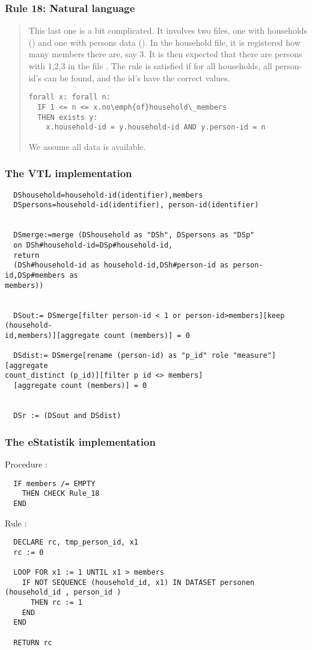 \newpage

\subsubsection*{  Rule 18: Natural language}
\begin{quote}


This last one is a bit complicated. It involves two files, one with households () and one with persons data (). In the household file, it is registered how many members there are, say 3. It is then expected that
there are persons with  1,2,3 in the file . The rule is satisfied if for all households, all person-id's can be found, and the id's have the correct values.


\begin{verbatim}
forall x: forall n:
  IF 1 <= n <= x.no\emph{of}household\_members
  THEN exists y: 
    x.household-id = y.household-id AND y.person-id = n
\end{verbatim}


We assume all data is available.

\end{quote}
\subsubsection*{The VTL implementation}
\begin{verbatim}
  DShousehold=household-id(identifier),members
  DSpersons=household-id(identifier), person-id(identifier)


  DSmerge:=merge (DShousehold as "DSh", DSpersons as "DSp"
  on DSh#household-id=DSp#household-id,
  return
  (DSh#household-id as household-id,DSh#person-id as person-id,DSp#members as
members))


  DSout:= DSmerge[filter person-id < 1 or person-id>members][keep (household-
id,members)][aggregate count (members)] = 0

  DSdist:= DSmerge[rename (person-id) as "p_id" role "measure"][aggregate
count_distinct (p_id)][filter p id <> members]
  [aggregate count (members)] = 0


  DSr := (DSout and DSdist)

\end{verbatim}

\subsubsection*{The eStatistik implementation}
\noindent
Procedure :
\begin{verbatim}
  IF members /= EMPTY
    THEN CHECK Rule_18
  END
\end{verbatim}
\noindent
Rule :
\begin{verbatim}
  DECLARE rc, tmp_person_id, x1
  rc := 0

  LOOP FOR x1 := 1 UNTIL x1 > members
    IF NOT SEQUENCE (household_id, x1) IN DATASET personen (household_id , person_id )
      THEN rc := 1
    END
  END

  RETURN rc
\end{verbatim}


